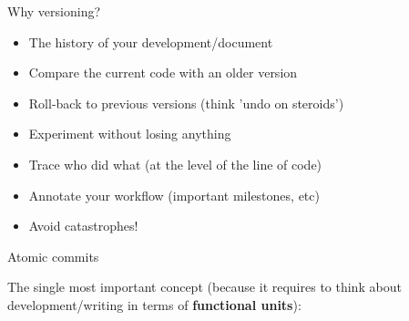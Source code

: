 \documentclass[compress]{beamer}
\begin{document}
\begin{frame}{Why versioning?}

    \begin{itemize}
        \item The history of your development/document
        \item Compare the current code with an older version
        \item Roll-back to previous versions (think 'undo on steroids')
        \item Experiment without losing anything
        \item Trace who did what (at the level of the line of code)
        \item Annotate your workflow (important milestones, etc)
        \item Avoid catastrophes!
    \end{itemize}
\end{frame}

\begin{frame}{Atomic commits}

    The single most important concept (because it requires to think about
    development/writing in terms of {\bf functional units}):



\end{frame}
\end{document}
